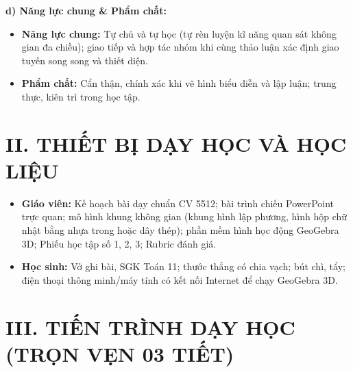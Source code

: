 \documentclass[12pt, a4paper]{article}
\begin{document}
\textbf{d) Năng lực chung \& Phẩm chất:}
\begin{itemize}[leftmargin=1.5em]
    \item \textbf{Năng lực chung:} Tự chủ và tự học (tự rèn luyện kĩ năng quan sát không gian đa chiều); giao tiếp và hợp tác nhóm khi cùng thảo luận xác định giao tuyến song song và thiết diện.
    \item \textbf{Phẩm chất:} Cẩn thận, chính xác khi vẽ hình biểu diễn và lập luận; trung thực, kiên trì trong học tập.
\end{itemize}

\section*{II. THIẾT BỊ DẠY HỌC VÀ HỌC LIỆU}
\begin{itemize}[leftmargin=1.5em]
    \item \textbf{Giáo viên:} Kế hoạch bài dạy chuẩn CV 5512; bài trình chiếu PowerPoint trực quan; mô hình khung không gian (khung hình lập phương, hình hộp chữ nhật bằng nhựa trong hoặc dây thép); phần mềm hình học động GeoGebra 3D; Phiếu học tập số 1, 2, 3; Rubric đánh giá.
    \item \textbf{Học sinh:} Vở ghi bài, SGK Toán 11; thước thẳng có chia vạch; bút chì, tẩy; điện thoại thông minh/máy tính có kết nối Internet để chạy GeoGebra 3D.
\end{itemize}

\section*{III. TIẾN TRÌNH DẠY HỌC (TRỌN VẸN 03 TIẾT)}

\begin{center}
\end{center}
\end{document}
